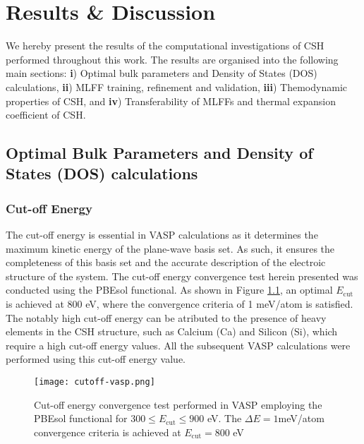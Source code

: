 \chapter{Results \& Discussion}
\label{Chapter4}
We hereby present the results of the computational investigations of CSH performed throughout this work. The results are organised into the following main sections: \textbf{i}) Optimal bulk parameters and Density of States (DOS) calculations, \textbf{ii}) MLFF training, refinement and validation, \textbf{iii}) Themodynamic properties of CSH, and \textbf{iv}) Transferability of MLFFs and thermal expansion coefficient of CSH. 
 
\section{Optimal Bulk Parameters and Density of States (DOS) calculations}

\subsection{Cut-off Energy}
The cut-off energy is essential in VASP calculations as it determines the maximum kinetic energy of the plane-wave basis set. As such, it ensures the completeness of this basis set and the accurate description of the electroic structure of the system.  The cut-off energy convergence test herein presented was conducted using the PBEsol functional. As shown in Figure \ref{cutoff-energy}, an optimal $E_{\text{cut}}$ is achieved at 800 eV, where the convergence criteria of 1 meV/atom is satisfied. The notably high cut-off energy can be atributed to the presence of heavy elements in the CSH structure, such as Calcium (Ca) and Silicon (Si), which require a high cut-off energy values\supercite{zotero-item-698}. All the subsequent VASP calculations were performed using this cut-off energy value.
\begin{figure}[H]
    \centering
    \texttt{[image: cutoff-vasp.png]}
    \caption{
    Cut-off energy convergence test performed in VASP employing the PBEsol functional for $300 \leq E_{\text{cut}} \leq 900$ eV. The $\Delta E = 1$meV/atom convergence criteria is achieved at $E_{\text {cut}} = 800$ eV}
    \label{cutoff-energy}
\end{figure}

